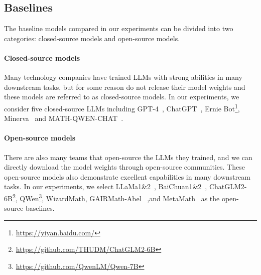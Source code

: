 \documentclass{article}
\begin{document}
\subsection{Baselines}
The baseline models compared in our experiments can be divided into two categories: closed-source models and open-source models.
\paragraph{Closed-source models} Many technology companies have trained LLMs with strong abilities in many downstream tasks, but for some reason do not release their model weights and these models are referred to as closed-source models.
In our experiments, we consider five closed-source LLMs including GPT-4~\cite{openai2023gpt4}, ChatGPT~\cite{openai2022chatgpt}, Ernie Bot\footnote{\url{https://yiyan.baidu.com/}}, Minerva~\cite{zhu2022solving} and MATH-QWEN-CHAT~\cite{qwen2023qwen}. 
\paragraph{Open-source models} There are also many teams that open-source the LLMs they trained, and we can directly download the model weights through open-source communities.
These open-source models also demonstrate excellent capabilities in many downstream tasks.
In our experiments, we select LLaMa1\&2~\cite{touvron2023llama, touvron2023llama2}, BaiChuan1\&2~\cite{baichuan2023baichuan2}, ChatGLM2-6B\footnote{\url{https://github.com/THUDM/ChatGLM2-6B}}, QWen\footnote{\url{https://github.com/QwenLM/Qwen-7B}}, WizardMath\cite{luo2023wizardmath}, GAIRMath-Abel~\cite{abel} ,and MetaMath~\cite{yu2023metamath} as the open-source baselines.
\end{document}
